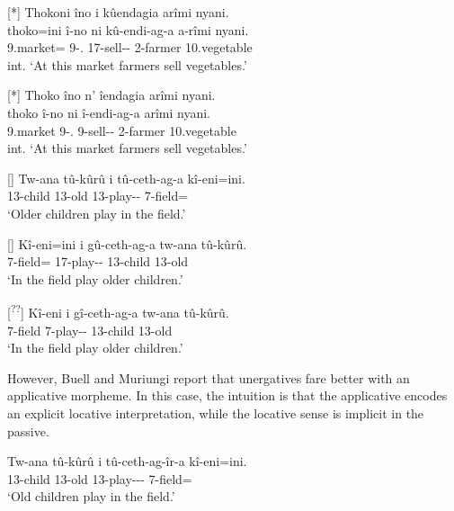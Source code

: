 \documentclass[output=paper]{langscibook}
\begin{document}
\ex
[*]{
Thokoni  îno  i  kûendagia  arîmi  nyani.\\
\gll
thoko=ini  î-no  ni  kû-endi-ag-a  a-rîmi  nyani.\\
9.market=\LOC{} 9-\DEM.\PROX{} \FOC{} 17\SM{}-sell-\HAB-\FV{} 2-farmer  10.vegetable\\
\glt
int. ‘At this market farmers sell vegetables.’
}

\ex
[*]{
Thoko  îno  n'  îendagia  arîmi  nyani.\\
\gll
thoko  î-no  ni  î-endi-ag-a  arîmi  nyani.\\
9.market  9-\DEM.\PROX{} \FOC{} 9\SM{}-sell-\HAB-\FV{} 2-farmer  10.vegetable\\
\glt
int. ‘At this market farmers sell vegetables.’
}

\z
\z

\ea
\citep[7]{BuellMuriungi2008}
\ea
[]{
\gll
Tw-ana  tû-kûrû  i  tû-ceth-ag-a  kî-eni=ini.\\
13-child  13-old \FOC{} 13\SM{}-play-\HAB-\FV{} 7-field=\LOC{}\\
\glt
‘Older children play in the field.’
}

\ex
[]{
\gll
Kî-eni=ini  i  gû-ceth-ag-a  tw-ana  tû-kûrû.\\
7-field=\LOC{} \FOC{} 17\SM{}-play-\HAB-\FV{} 13-child  13-old\\
\glt
‘In the field play older children.’
}

\ex
[\textsuperscript{??}]{
\gll
Kî-eni  i  gî-ceth-ag-a  tw-ana  tû-kûrû.\\
7-field \FOC{} 7\SM{}-play-\HAB-\FV{} 13-child  13-old\\
\glt
‘In the field play older children.’
}

\z
\z

However, Buell and Muriungi report that unergatives fare better with an applicative morpheme. In this case, the intuition is that the applicative encodes an explicit locative interpretation, while the locative sense is implicit in the passive.


\ea
\citep[10]{BuellMuriungi2008}
\ea
\gll
Tw-ana  tû-kûrû  i  tû-ceth-ag-îr-a  kî-eni=ini.\\
13-child  13-old \FOC{} 13\SM{}-play-\HAB-\APPL-\FV{} 7-field=\LOC{}\\
\glt
‘Old children play in the field.’
\end{document}
